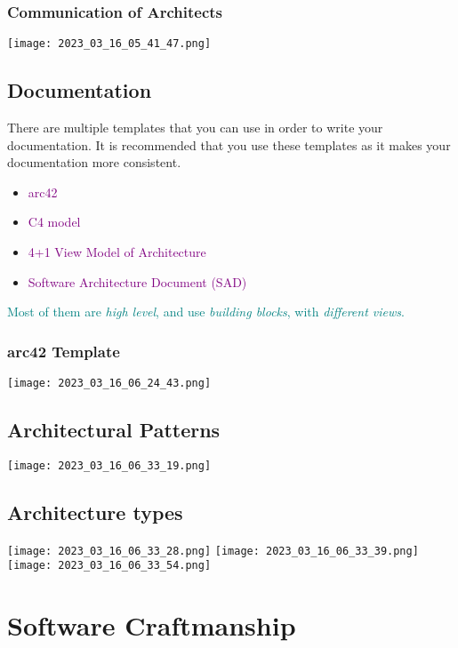 \documentclass[main.tex,fontsize=8pt,paper=a4,paper=portrait,DIV=calc,]{scrartcl}
\begin{document}
\subsubsection{Communication of Architects}
\texttt{[image: 2023\_03\_16\_05\_41\_47.png]}

\subsection{Documentation}
There are multiple templates that you can use in order to write your documentation. \newline
It is recommended that you use these templates as it makes your documentation more consistent.\newline
\begin{itemize}
\item \textcolor{purple}{arc42}
\item \textcolor{purple}{C4 model}
\item \textcolor{purple}{4+1 View Model of Architecture}
\item \textcolor{purple}{Software Architecture Document (SAD)}
\end{itemize} 
\textcolor{teal}{Most of them are \emph{high level}, and use \emph{building blocks}, with \emph{different views}.}

\subsubsection{arc42 Template}
\texttt{[image: 2023\_03\_16\_06\_24\_43.png]}

\subsection{Architectural Patterns}
\texttt{[image: 2023\_03\_16\_06\_33\_19.png]}

\subsection{Architecture types}
\texttt{[image: 2023\_03\_16\_06\_33\_28.png]}
\texttt{[image: 2023\_03\_16\_06\_33\_39.png]}\newline
\texttt{[image: 2023\_03\_16\_06\_33\_54.png]}

\section{Software Craftmanship}
\end{document}
